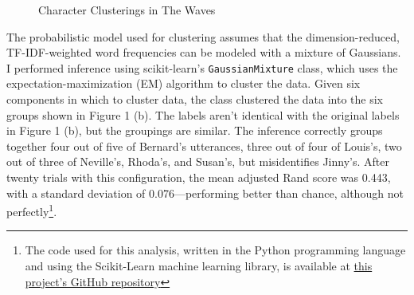 \documentclass[12pt]{article}
\begin{document}
\begin{figure}
\centering   
{}
\caption{Character Clusterings in The Waves}
\end{figure}

The probabilistic model used for clustering assumes that the
dimension-reduced, TF-IDF-weighted word frequencies can be modeled with
a mixture of Gaussians. I performed inference using scikit-learn's
\texttt{GaussianMixture} class, which uses the expectation-maximization
(EM) algorithm to cluster the data. Given six components in which to
cluster data, the class clustered the data into the six groups shown in
Figure 1 (b). The labels aren't identical with the original labels in
Figure 1 (b), but the groupings are similar. The inference correctly
groups together four out of five of Bernard's utterances, three out of
four of Louis's, two out of three of Neville's, Rhoda's, and Susan's,
but misidentifies Jinny's. After twenty trials with this configuration,
the mean adjusted Rand score was 0.443, with a standard deviation of
0.076---performing better than chance, although not perfectly\footnote{The
  code used for this analysis, written in the Python programming
  language and using the Scikit-Learn machine learning library, is
  available at
  \href{https://github.com/JonathanReeve/character-attribution/blob/master/clarissa/clarissa-grid-search.ipynb}{this
  project's GitHub repository}}.
\end{document}
